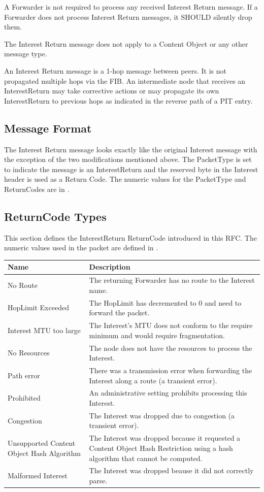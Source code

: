 \documentclass[12pt]{article}
\begin{document}
A Forwarder is not required to process any received Interest Return
message.  If a Forwarder does not process Interest Return messages,
it SHOULD silently drop them.

The Interest Return message does not apply to a Content Object or any
other message type.

An Interest Return message is a 1-hop message between peers.  It is
not propagated multiple hops via the FIB.  An intermediate node that
receives an InterestReturn may take corrective actions or may
propagate its own InterestReturn to previous hops as indicated in the
reverse path of a PIT entry.

\subsection{Message Format}
The Interest Return message looks exactly like the original Interest
message with the exception of the two modifications mentioned above.
The PacketType is set to indicate the message is an InterestReturn
and the reserved byte in the Interest header is used as a Return
Code.  The numeric values for the PacketType and ReturnCodes are in
\cite{messages}.

\subsection{ReturnCode Types}
This section defines the InterestReturn ReturnCode introduced in this
RFC.  The numeric values used in the packet are defined in
\cite{messages}.

\begin{table}[t!]
\center
\begin{tabular}{|p{5cm}|p{9cm}|} \hline
{\bf Name} & {\bf Description} \\ \hline
No Route & The returning Forwarder has no route to the Interest name. \\
HopLimit Exceeded & The HopLimit has decremented to 0 and need to forward the packet. \\
Interest MTU too large & The Interest's MTU does not conform to the require minimum and would require fragmentation. \\
No Resources & The node does not have the resources to process the Interest. \\
Path error & There was a transmission error when forwarding the Interest along a route (a transient error). \\
Prohibited & An administrative setting prohibits processing this Interest. \\
Congestion & The Interest was dropped due to congestion (a transient error). \\
Unsupported Content Object Hash Algorithm & The Interest was dropped because it requested a Content Object Hash Restriction using a hash algorithm that cannot be computed. \\
Malformed Interest & The Interest was dropped beause it did not correctly parse. \\ \hline
\end{tabular}
\end{table}
\end{document}
